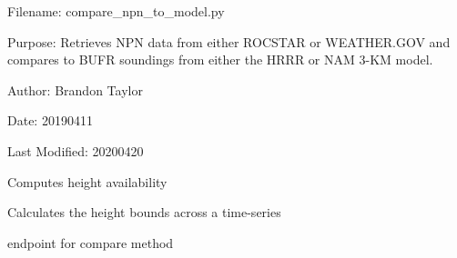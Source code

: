 \documentclass[letterpaper,10pt,english]{sphinxmanual}
\begin{document}
\label{\detokenize{index:module-compare_npn_to_model}}
Filename: compare\_npn\_to\_model.py

Purpose: Retrieves NPN data from either
ROCSTAR or WEATHER.GOV and compares to BUFR soundings
from either the HRRR or NAM 3-KM model.

Author: Brandon Taylor

Date: 20190411

Last Modified: 20200420

\begin{fulllineitems}
\label{\detokenize{index:compare_npn_to_model.available}}
Computes height availability

\end{fulllineitems}


\begin{fulllineitems}
\label{\detokenize{index:compare_npn_to_model.calc_min_max}}
Calculates the height bounds across a time-series

\end{fulllineitems}


\begin{fulllineitems}
\label{\detokenize{index:compare_npn_to_model.compare_profiles}}
endpoint for compare method

\end{fulllineitems}

\end{document}
